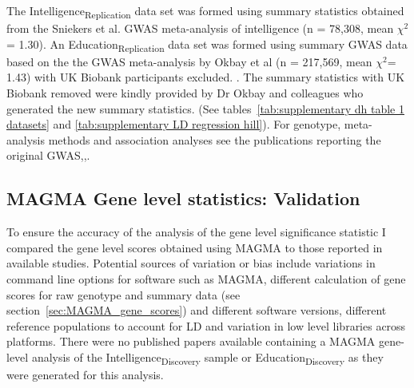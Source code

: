 The Intelligence\textsubscript{Replication} data set was formed using summary statistics obtained from the Sniekers et al. GWAS meta-analysis of intelligence (n = 78,308, mean $\chi^2$= 1.30).  \cite{sniekers2017genome}  An Education\textsubscript{Replication} data set was formed using summary GWAS data based on the the GWAS meta-analysis by Okbay et al (n = 217,569, mean $\chi^2$= 1.43) with UK Biobank participants excluded. \cite{okbay2016genome}. The summary statistics with UK Biobank removed were kindly provided by Dr Okbay and colleagues who generated the new summary statistics.    (See tables~\ref{tab:supplementary dh table 1 datasets} and \ref{tab:supplementary LD regression hill}). 
For genotype, meta-analysis methods and association analyses see the publications reporting the original GWAS\cite{sniekers2017genome},\cite{okbay2016genome},\cite{hill2019combined}.




 





\subsection{MAGMA Gene level statistics: Validation}
\label{sec:MAGMA Gene level statistics validation from other studies}

To ensure the accuracy of the analysis of the gene level significance statistic I compared the gene level scores obtained using MAGMA to those reported in available studies\cite{de2015magma}. Potential sources of variation or bias include variations in command line options for software such as MAGMA,  different calculation of gene scores for raw genotype and summary data (see section~\ref{sec:MAGMA_gene_scores}) and different software versions, different reference populations to account for LD and variation in low level libraries across platforms\cite{kim2018experimenting}. There were no published papers available containing a MAGMA gene-level analysis of the Intelligence\textsubscript{Discovery} sample or Education\textsubscript{Discovery} as they were generated for this analysis.

